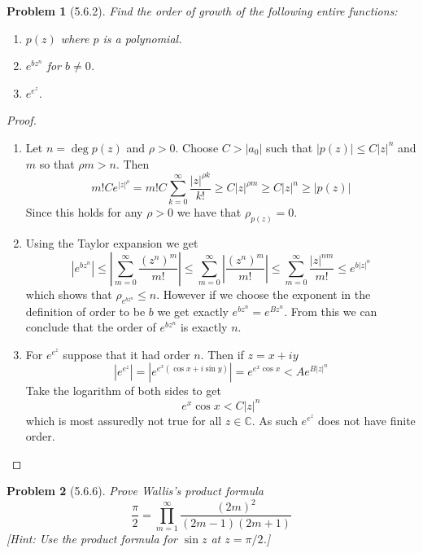 \documentclass[10pt]{article}
\newcommand{\sk}{\vskip 6mm}
\newcommand{\bb}[1]{\mathbb{#1}}
\theoremstyle{plain}
\newtheorem{problem}{Problem}
\theoremstyle{remark}
\begin{document}
\begin{problem}[5.6.2]
  Find the order of growth of the following entire functions:
  \begin{enumerate}
  \item[(a)] $p\left(z\right)$ where $p$ is a polynomial.
  \item[(b)] $e^{bz^n}$ for $b\neq 0$.
  \item[(c)] $e^{e^z}$.
  \end{enumerate}
\end{problem}

\begin{proof}
  \begin{enumerate}
  \item[(a)] Let $n=\deg p\left(z\right)$ and $\rho>0$. Choose $C>|a_0|$ such that $|p\left(z\right)|\leq C|z|^n$
    and $m$ so that $\rho m>n$. Then
    \[
      m!Ce^{\left|z\right|^\rho}=m!C\sum_{k=0}^\infty\frac{\left|z\right|^{\rho k}}{k!}\geq C\left|z\right|^{\rho m}\geq C\left|z\right|^n\geq\left|p\left(z\right)\right|
    \]
    Since this holds for any $\rho>0$ we have that $\rho_{p\left(z\right)}=0$.
  \item[(b)] Using the Taylor expansion we get
    \[
      \left|e^{bz^n}\right|\leq\left|\sum_{m=0}^\infty\frac{\left(z^n\right)^m}{m!}\right|\leq\sum_{m=0}^\infty\left|\frac{\left(z^n\right)^m}{m!}\right|\leq\sum_{m=0}^\infty\frac{\left|z\right|^{nm}}{m!}\leq e^{b\left|z\right|^n}
    \]
    which shows that $\rho_{e^{bz^n}}\leq n$. However if we choose the exponent in the
    definition of order to be $b$ we get exactly $e^{bz^n}=e^{Bz^n}$. From this
    we can conclude that the order of $e^{bz^n}$ is exactly $n$.

  \item[(c)] For $e^{e^z}$ suppose that it had order $n$. Then if $z=x+iy$
    \[
      \left|e^{e^z}\right|=\left|e^{e^x\left(\cos x+i\sin y\right)}\right|=e^{e^x\cos x}< Ae^{B\left|z\right|^n}
    \]
    Take the logarithm of both sides to get
    \[
      e^x\cos x < C\left|z\right|^n
    \]
    which is most assuredly not true for all $z\in\bb{C}$. As
    such $e^{e^z}$ does not have finite order.
  \end{enumerate}
\end{proof}

\sk

\begin{problem}[5.6.6]
  Prove Wallis's product formula
  \[
    \frac{\pi}{2}=\prod_{m=1}^\infty\frac{\left(2m\right)^2}{\left(2m-1\right)\left(2m+1\right)}
  \]
  [Hint: Use the product formula for $\sin z$ at $z=\pi/2$.]
\end{problem}
\end{document}
